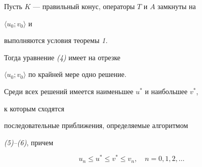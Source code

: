 \begin{thm} Пусть $K$ --- правильный конус, операторы $T$ и $A$ замкнуты на


$\langle u_0;v_0\rangle$ и


выполняются условия теоремы {\em 1.}





Тогда уравнение {\em (4)} имеет на отрезке


$\langle u_0;v_0\rangle$ по крайней мере одно решение.


Среди всех решений имеется наименьшее $u^*$ и наибольшее $v^*$,


к которым сходятся


последовательные приближения, определяемые алгоритмом


{\em (5)--(6)}, причем


\begin{equation}


u_n\le u^*\le v^*\le v_n,\quad n=0,1,2,\dotsc


\end{equation}


\end{thm}





